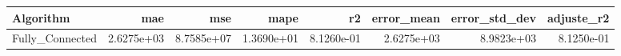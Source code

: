 \begin{tabular}{lrrrrrrr}
\toprule
Algorithm & mae & mse & mape & r2 & error_mean & error_std_dev & adjuste_r2 \\
\midrule
Fully_Connected & 2.6275e+03 & 8.7585e+07 & 1.3690e+01 & 8.1260e-01 & 2.6275e+03 & 8.9823e+03 & 8.1250e-01 \\
\bottomrule
\end{tabular}
